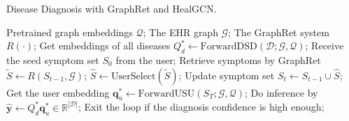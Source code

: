 \documentclass[sigconf]{acmart}
\newcommand{\q}{\bm{q}}
\newcommand{\bd}{\mathcal{D}}
\newcommand{\bq}{\mathcal{Q}}
\begin{document}
\begin{algorithm}[t] 
\caption{Disease Diagnosis with GraphRet and HealGCN. \label{alg:1}}
\begin{algorithmic}[1]
\Require Pretrained graph embeddings $\bq$; The EHR graph $\mathcal{G}$; The GraphRet system $R(\cdot)$;
\State Get embeddings of all diseases $Q_{d}^* \gets \text{ForwardDSD}(\bd;\mathcal{G},\bq)$;
\State Receive the seed symptom set $S_0$ from the user;
\State Retrieve symptoms by GraphRet $\tilde{S} \gets R(S_{t-1}, \mathcal{G})$;
\State  $\hat{S} \gets \text{UserSelect}(\tilde{S})$;
\State Update symptom set $S_t \gets S_{t-1} \cup \hat{S}$;
\State Get the user embedding $\q^*_u \gets \text{ForwardUSU}(S_T;\mathcal{G},\bq)$;
\State Do inference by $\bm{\hat{y}}\gets Q_{d}^*\q_u^{*} \in \mathbb{R}^{|\bd|}$;
\State Exit the loop if the diagnosis confidence is high enough;
\EndFor

\end{algorithmic}
\end{algorithm}
\end{document}
